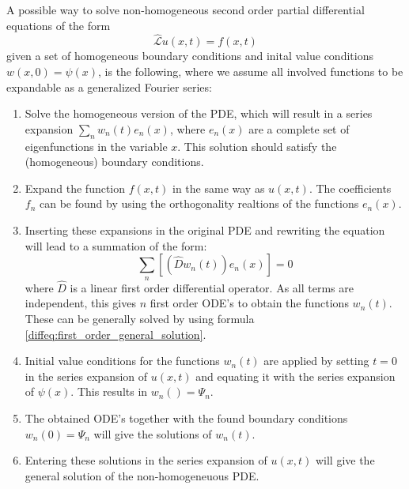     \begin{method}
		A possible way to solve non-homogeneous second order partial differential equations of the form
        \[
        	\hat{\mathcal{L}}u(x, t) = f(x, t)
        \]
        given a set of homogeneous boundary conditions and inital value conditions $w(x, 0) = \psi(x)$, is the following, where we assume all involved functions to be expandable as a generalized Fourier series:
        \begin{enumerate}
			\item Solve the homogeneous version of the PDE, which will result in a series expansion $\sum_nw_n(t)e_n(x)$, where $e_n(x)$ are a complete set of eigenfunctions in the variable $x$. This solution should satisfy the (homogeneous\footnotemark) boundary conditions.
            \item Expand the function $f(x, t)$ in the same way as $u(x, t)$. The coefficients $f_n$ can be found by using the orthogonality realtions of the functions $e_n(x)$.
            \item Inserting these expansions in the original PDE and rewriting the equation will lead to a summation of the form:
            \[
            	\sum_n\left[\left(\hat{D}w_n(t)\right)e_n(x)\right] = 0
            \]
            where $\hat{D}$ is a linear first order differential operator. As all terms are independent, this gives $n$ first order ODE's to obtain the functions $w_n(t)$. These can be generally solved by using formula \ref{diffeq:first_order_general_solution}.
            \item Initial value conditions for the functions $w_n(t)$ are applied by setting $t=0$ in the series expansion of $u(x, t)$ and equating it with the series expansion of $\psi(x)$. This results in $w_n() = \Psi_n$.
            \item The obtained ODE's together with the found boundary conditions $w_n(0) = \Psi_n$ will give the solutions of $w_n(t)$.
            \item Entering these solutions in the series expansion of $u(x, t)$ will give the general solution of the non-homogeneuous PDE.
		\end{enumerate}
	\end{method}
    
